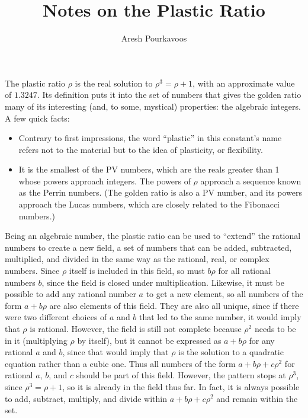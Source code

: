 \documentclass{article}
\begin{document}
\title{Notes on the Plastic Ratio}
\author{Aresh Pourkavoos}
\maketitle

The plastic ratio $\rho$ is the real solution to $\rho^3 = \rho+1$,
with an approximate value of $1.3247$.
Its definition puts it into the set of numbers
that gives the golden ratio many of its interesting
(and, to some, mystical) properties: the algebraic integers.
A few quick facts:
\begin{itemize}
\item
  Contrary to first impressions,
  the word ``plastic'' in this constant's name
  refers not to the material but to the idea of plasticity, or flexibility.
\item
  It is the smallest of the PV numbers,
  which are the reals greater than 1
  whose powers approach integers.
  The powers of $\rho$ approach a sequence known as the Perrin numbers.
  (The golden ratio is also a PV number,
  and its powers approach the Lucas numbers,
  which are closely related to the Fibonacci numbers.)
\end{itemize}

Being an algebraic number,
the plastic ratio can be used to ``extend'' the rational numbers
to create a new field,
a set of numbers that can be added, subtracted, multiplied, and divided
in the same way as the rational, real, or complex numbers.
Since $\rho$ itself is included in this field,
so must $b\rho$ for all rational numbers $b$,
since the field is closed under multiplication.
Likewise, it must be possible to add any rational number $a$
to get a new element,
so all numbers of the form $a+b\rho$ are also elements of this field.
They are also all unique,
since if there were two different choices of $a$ and $b$
that led to the same number,
it would imply that $\rho$ is rational.
However, the field is still not complete
because $\rho^2$ needs to be in it
(multiplying $\rho$ by itself),
but it cannot be expressed as $a+b\rho$
for any rational $a$ and $b$,
since that would imply that $\rho$ is the solution to a quadratic equation
rather than a cubic one.
Thus all numbers of the form $a+b\rho+c\rho^2$
for rational $a$, $b$, and $c$ should be part of this field.
However, the pattern stops at $\rho^3$,
since $\rho^3=\rho+1$,
so it is already in the field thus far.
In fact, it is always possible to add, subtract, multiply, and divide
within $a+b\rho+c\rho^2$ and remain within the set.
\end{document}

